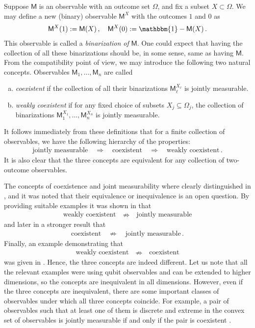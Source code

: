 \documentclass[12pt]{iopart}
\theoremstyle{definition}
\newcommand{\id}{\mathbbm{1}} %
\newcommand{\Mo}{\mathsf{M}}%
\begin{document}
Suppose $\Mo$ is an observable with an outcome set $\Omega$, and fix 
a subset $X\subset\Omega$. We may define a new (binary) observable 
$\Mo^X$ with the outcomes $1$ 
and $0$ as
\begin{equation}
\Mo^X(1) := \Mo(X) \, , \quad \Mo^X(0) := \id-\Mo(X) \, .
\end{equation} 
This observable is called a \emph{binarization of} $\Mo$.
One could expect that having the collection of all these binarizations 
should be, in some sense, same as having $\Mo$. From the compatibility 
point of view, we may introduce the following two natural concepts. 
Observables $\Mo_1,\ldots,\Mo_n$ are called
\begin{enumerate}[(a)]
\item \emph{coexistent} if the collection of all their binarizations $\Mo_\ell^{X_\ell}$ is jointly measurable.
\item \emph{weakly coexistent} if for any fixed choice of subsets $X_j \subseteq \Omega_j$, the collection of binarizations $\Mo_1^{X_1},\ldots,\Mo_n^{X_n}$ is jointly measurable.
\end{enumerate}
It follows immediately from these definitions that for a finite collection of observables, we have the following hierarchy of the properties:
\begin{align*}
\textrm{jointly measurable} \quad \Rightarrow \quad \textrm{coexistent} \quad \Rightarrow \quad \textrm{weakly coexistent} \, .
\end{align*}
It is also clear that the three concepts are equivalent for any collection of two-outcome observables.

The concepts of coexistence and joint measurability where clearly distinguished in \cite{LaPu97}, \cite{LaPu01} and it was noted that their equivalence or inequivalence is an open question. 
By providing suitable examples it was shown in \cite{HeReSt08} that 
\begin{align*}
\textrm{weakly coexistent}  \quad \nRightarrow \quad  \textrm{jointly measurable}
\end{align*}
and later in \cite{ReReWo13} a stronger result that
\begin{align*}
\textrm{coexistent} \quad \nRightarrow \quad \textrm{jointly measurable} \, .
\end{align*}
Finally, an example demonstrating that 
\begin{align*}
\textrm{weakly coexistent} \quad \nRightarrow \quad \textrm{coexistent}
\end{align*}
was given in \cite{HaPeUo15}.
Hence, the three concepts are indeed different. Let us note that all the relevant examples were using qubit observables and can be extended to higher dimensions, so the concepts are inequivalent in all dimensions.
However, even if the three concepts are inequivalent, there are some important classes of observables under which all three concepts coincide. For example, a pair of observables such that at least one of them is discrete and extreme in the convex set of observables is jointly measurable if and only if the pair is coexistent \cite{HaPeUo15}. 
\end{document}
